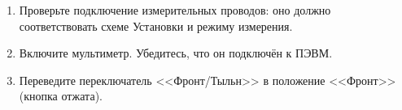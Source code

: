 \begin{enumerate}

\item Проверьте подключение измерительных проводов: оно должно соответствовать схеме Установки и режиму измерения.
\item Включите мультиметр. Убедитесь, что он подключён к ПЭВМ.
\item Переведите переключатель <<Фронт/Тыльн>> в положение <<Фронт>> (кнопка отжата). 

\end{enumerate}
